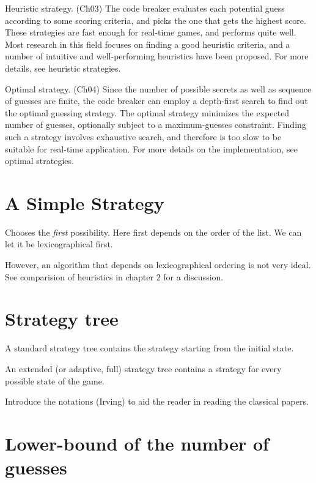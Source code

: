 Heuristic strategy. (Ch03) The code breaker evaluates each potential guess according to some scoring criteria, and picks the one that gets the highest score. These strategies are fast enough for real-time games, and performs quite well. Most research in this field focuses on finding a good heuristic criteria, and a number of intuitive and well-performing heuristics have been proposed. For more details, see heuristic strategies.

Optimal strategy. (Ch04) Since the number of possible secrets as well as sequence of guesses are finite, the code breaker can employ a depth-first search to find out the optimal guessing strategy. The optimal strategy minimizes the expected number of guesses, optionally subject to a maximum-guesses constraint. Finding such a strategy involves exhaustive search, and therefore is too slow to be suitable for real-time application. For more details on the implementation, see optimal strategies.

\section{A Simple Strategy}

Chooses the \emph{first} possibility. Here first depends on the order of the list. We can let it be lexicographical first. 

However, an algorithm that depends on lexicographical ordering is not very ideal. See comparision of heuristics in chapter 2 for a discussion.
 
\section{Strategy tree}

A standard strategy tree contains the strategy starting from the initial state.

An extended (or adaptive, full) strategy tree contains a strategy for every possible state of the game.

Introduce the notations (Irving) to aid the reader in reading the classical papers.
  
\section{Lower-bound of the number of guesses}

























